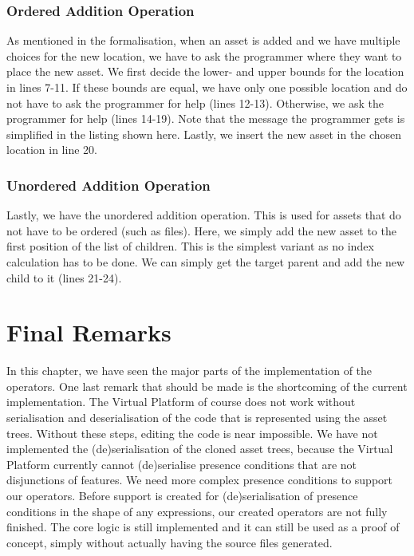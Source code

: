\subsubsection*{Ordered Addition Operation}
As mentioned in the formalisation, when an asset is added and we have multiple choices
for the new location, we have to ask the programmer where they want to place the new
asset. We first decide the lower- and upper bounds for the location in lines 7-11. If 
these bounds are equal, we have only one possible location and do not have to ask the
programmer for help (lines 12-13). Otherwise, we ask the programmer for help (lines 14-19).
Note that the message the programmer gets is simplified in the listing shown here. Lastly,
we insert the new asset in the chosen location in line 20.

\subsubsection*{Unordered Addition Operation}
Lastly, we have the unordered addition operation. This is used for assets that do not have
to be ordered (such as files). Here, we simply add the new asset to the first position of
the list of children. This is the simplest variant as no index calculation has to be done.
We can simply get the target parent and add the new child to it (lines 21-24).

\section{Final Remarks}
In this chapter, we have seen the major parts of the implementation of the operators.
One last remark that should be made is the shortcoming of the current implementation.
The Virtual Platform of course does not work without serialisation and deserialisation
of the code that is represented using the asset trees. Without these steps, editing the
code is near impossible. We have not implemented the (de)serialisation of the cloned
asset trees, because the Virtual Platform currently cannot (de)serialise presence
conditions that are not disjunctions of features. We need more complex presence conditions
to support our operators. Before support is created for (de)serialisation of presence
conditions in the shape of any expressions, our created operators are not fully finished.
The core logic is still implemented and it can still be used as a proof of concept, simply
without actually having the source files generated.

